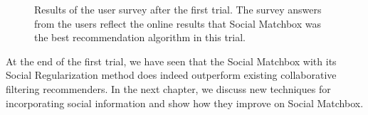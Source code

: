 \begin{figure}[h]
\caption{Results of the user survey after the first trial. The survey answers from the users reflect the online results that Social Matchbox was the best recommendation algorithm in this trial.}
\label{fig:survey1}
\end{figure}

At the end of the first trial, we have seen that the Social Matchbox with its Social Regularization method does indeed outperform existing collaborative filtering recommenders. In the next chapter, we discuss new techniques for incorporating social information and show how they improve on Social Matchbox.
